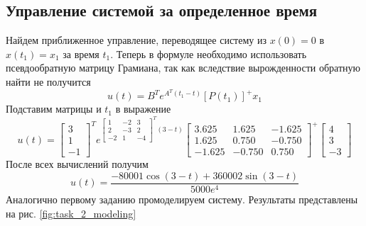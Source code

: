 \documentclass[a4paper, 12pt]{article}
\begin{document}
    \subsection{Управление системой за определенное время}
    Найдем приближенное управление, переводящее систему из $x(0)=0$ в $x(t_1)=x_1$ за время $t_1$.
    Теперь в формуле необходимо использовать псевдообратную матрицу Грамиана, так как вследствие
    вырожденности обратную найти не получится
    $$u(t)=B^Te^{A^T(t_1-t)}\left[P(t_1)\right]^{+}x_1$$
    Подставим матрицы и $t_1$ в выражение
    $$
    u(t)=\begin{bmatrix}
        3\\
        1\\
        -1
    \end{bmatrix}^T
    e^{\begin{bmatrix}
        1 &-2 &3\\
        2 &-3 &2\\
        -2 &1 &-4
    \end{bmatrix}^T\left(3-t\right)}\begin{bmatrix}
        3.625    &1.625   &-1.625\\
        1.625    &0.750   &-0.750\\
       -1.625   &-0.750    &0.750
        \end{bmatrix}^{+}\begin{bmatrix}
            4\\
            3\\
            -3
        \end{bmatrix}
    $$
    После всех вычислений получим
    $$
    u(t)=\dfrac{-80001\cos{(3-t)}+360002\sin{(3-t)}}{5000e^4}  
    $$
    Аналогично первому заданию промоделируем систему. Результаты представлены на рис. \ref{fig:task_2_modeling}
\end{document}
